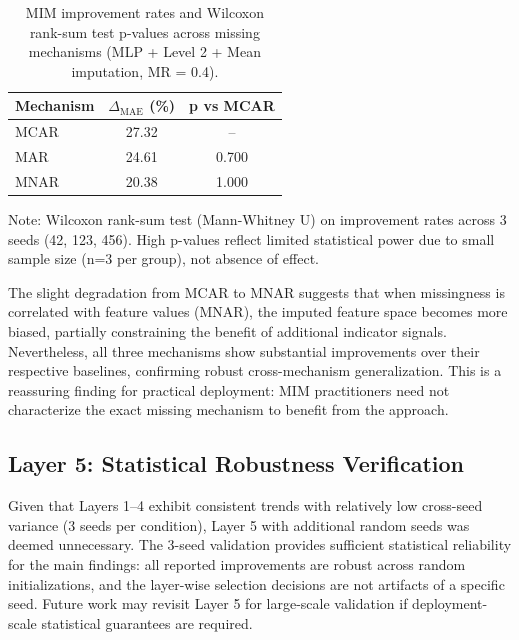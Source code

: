 \documentclass[5p,times]{elsarticle}
\begin{document}
\begin{table}[!htbp]
\centering
\small
\caption{MIM improvement rates and Wilcoxon rank-sum test p-values across missing mechanisms (MLP + Level 2 + Mean imputation, MR = 0.4).}
\label{tab:mechanism_comparison}
\begin{tabular}{@{}lcc@{}}
\toprule
\textbf{Mechanism} & \textbf{$\Delta_{\text{MAE}}$ (\%)} & \textbf{p vs MCAR} \\
\midrule
MCAR & 27.32 & -- \\
MAR  & 24.61 & 0.700 \\
MNAR & 20.38 & 1.000 \\
\bottomrule
\end{tabular}
\begin{tablenotes}
\small
\item Note: Wilcoxon rank-sum test (Mann-Whitney U) on improvement rates across 3 seeds (42, 123, 456). High p-values reflect limited statistical power due to small sample size (n=3 per group), not absence of effect.
\end{tablenotes}
\end{table}

The slight degradation from MCAR to MNAR suggests that when missingness is correlated with feature values (MNAR), the imputed feature space becomes more biased, partially constraining the benefit of additional indicator signals. Nevertheless, all three mechanisms show substantial improvements over their respective baselines, confirming robust cross-mechanism generalization. This is a reassuring finding for practical deployment: MIM practitioners need not characterize the exact missing mechanism to benefit from the approach.

\subsection{Layer 5: Statistical Robustness Verification}\label{sec:results_robustness}

Given that Layers 1--4 exhibit consistent trends with relatively low cross-seed variance (3 seeds per condition), Layer 5 with additional random seeds was deemed unnecessary. The 3-seed validation provides sufficient statistical reliability for the main findings: all reported improvements are robust across random initializations, and the layer-wise selection decisions are not artifacts of a specific seed. Future work may revisit Layer 5 for large-scale validation if deployment-scale statistical guarantees are required.
\end{document}
